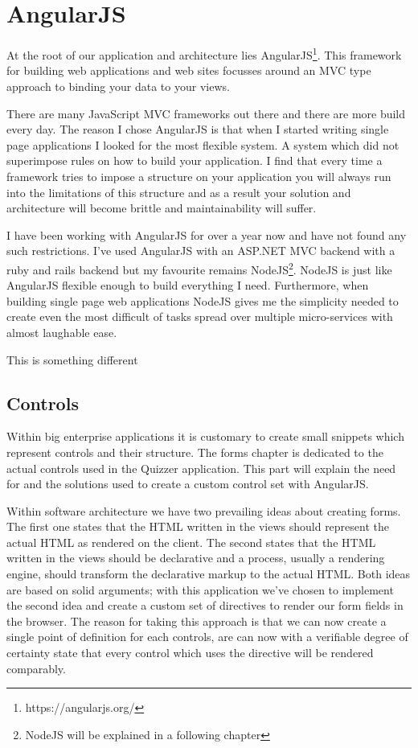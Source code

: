 


\section{AngularJS}
At the root of our application and architecture lies AngularJS\footnote{https://angularjs.org/}. This framework for building web applications and web sites focusses around an MVC type approach to binding your data to your views. 

There are many JavaScript MVC frameworks out there and there are more build every day. The reason I chose AngularJS is that when I started writing single page applications I looked for the most flexible system. A system which did not superimpose rules on how to build your application. I find that every time a framework tries to impose a structure on your application you will always run into the limitations of this structure and as a result your solution and architecture will become brittle and maintainability will suffer. 

I have been working with AngularJS for over a year now and have not found any such restrictions. I’ve used AngularJS with an ASP.NET MVC backend with a ruby and rails backend but my favourite remains NodeJS\footnote{NodeJS will be explained in a following chapter}.  NodeJS is just like AngularJS flexible enough to build everything I need. Furthermore, when building single page web applications NodeJS gives me the simplicity needed to create even the most difficult of tasks spread over multiple micro-services with almost laughable ease.

\bigskip
This is something different

\subsection{Controls}
Within big enterprise applications it is customary to create small snippets which represent controls and their structure. The forms chapter is dedicated to the actual controls used in the Quizzer application. This part will explain the need for and the solutions used to create a custom control set with AngularJS.

Within software architecture we have two prevailing ideas about creating forms. The first one states that the HTML written in the views should represent the actual HTML as rendered on the client. The second states that the HTML written in the views should be declarative and a process, usually a rendering engine, should transform the declarative markup to the actual HTML. Both ideas are based on solid arguments; with this application we've chosen to implement the second idea and create a custom set of directives to render our form fields in the browser. The reason for taking this approach is that we can now create a single point of definition for each controls, are can now with a verifiable degree of certainty state that every control which uses the directive will be rendered comparably. 

\pagebreak